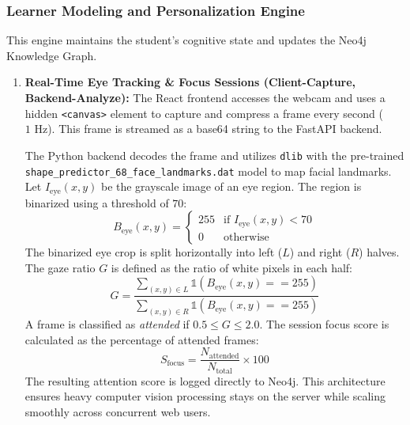 \subsubsection{Learner Modeling and Personalization Engine}
\label{subsubsec:learner_modeling_engine}

This engine maintains the student's cognitive state and updates the Neo4j Knowledge Graph.

\begin{enumerate}
    \item \textbf{Real-Time Eye Tracking \& Focus Sessions (Client-Capture, Backend-Analyze):} The React frontend accesses the webcam and uses a hidden \texttt{<canvas>} element to capture and compress a frame every second ($1\text{ Hz}$). This frame is streamed as a base64 string to the FastAPI backend.
    
    The Python backend decodes the frame and utilizes \texttt{dlib} with the pre-trained \texttt{shape\_predictor\_68\_face\_landmarks.dat} model to map facial landmarks. Let $I_{\text{eye}}(x,y)$ be the grayscale image of an eye region. The region is binarized using a threshold of $70$:
    \begin{equation}
        B_{\text{eye}}(x,y) = \begin{cases} 255 & \text{if } I_{\text{eye}}(x,y) < 70 \\ 0 & \text{otherwise} \end{cases}
    \end{equation}
    The binarized eye crop is split horizontally into left ($L$) and right ($R$) halves. The gaze ratio $G$ is defined as the ratio of white pixels in each half:
    \begin{equation}
        G = \frac{\sum_{(x,y) \in L} \mathbb{1}(B_{\text{eye}}(x,y) == 255)}{\sum_{(x,y) \in R} \mathbb{1}(B_{\text{eye}}(x,y) == 255)}
    \end{equation}
    A frame is classified as \textit{attended} if $0.5 \le G \le 2.0$. The session focus score is calculated as the percentage of attended frames:
    \begin{equation}
        S_{\text{focus}} = \frac{N_{\text{attended}}}{N_{\text{total}}} \times 100
    \end{equation}
    The resulting attention score is logged directly to Neo4j. This architecture ensures heavy computer vision processing stays on the server while scaling smoothly across concurrent web users.


\end{enumerate}
